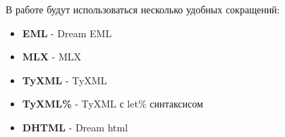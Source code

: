 В работе будут использоваться несколько удобных сокращений:

\begin{itemize}
    \item \textbf{EML} - Dream EML
    \item \textbf{MLX} - MLX
    \item \textbf{TyXML} - TyXML
    \item \textbf{TyXML\%} - TyXML с let\% синтаксисом
    \item \textbf{DHTML} - Dream html
\end{itemize}
